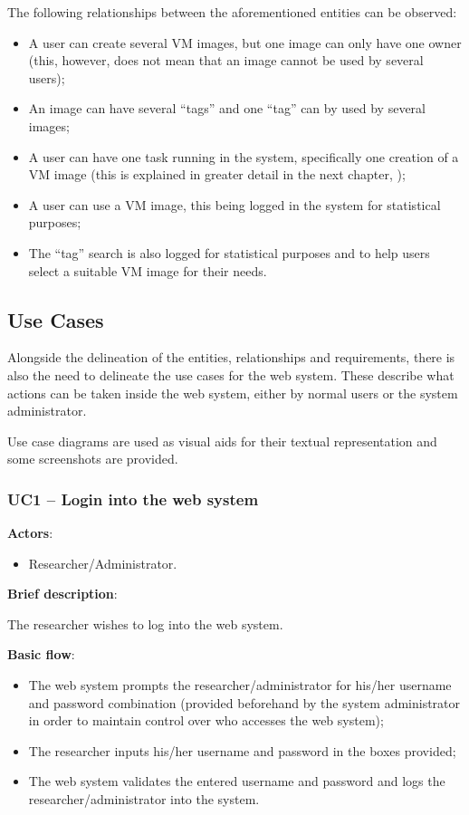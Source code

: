 The following relationships between the aforementioned entities can be observed:

\begin{itemize}
\item A user can create several VM images, but one image can only have one owner (this, however, does not mean that an image cannot be used by several users);
\item An image can have several ``tags'' and one ``tag'' can by used by several images;
\item A user can have one task running in the system, specifically one creation of a VM image (this is explained in greater detail in the next chapter, );
\item A user can use a VM image, this being logged in the system for statistical purposes;
\item The ``tag'' search is also logged for statistical purposes and to help users select a suitable VM image for their needs.
\end{itemize}

\subsection{Use Cases}\label{sec:use-cases}

Alongside the delineation of the entities, relationships and requirements, there is also the need to delineate the use cases for the web system. These describe what actions can be taken inside the web system, either by normal users or the system administrator.

Use case diagrams are used as visual aids for their textual representation and some screenshots are provided. 

\subsubsection{UC1 -- Login into the web system}\label{uc1}

\textbf{Actors}:

\begin{itemize}
\item Researcher/Administrator.
\end{itemize}

\textbf{Brief description}:

The researcher wishes to log into the web system.

\textbf{Basic flow}:

\begin{itemize}
\item The web system prompts the researcher/administrator for his/her username and password combination (provided beforehand by the system administrator in order to maintain control over who accesses the web system);
\item The researcher inputs his/her username and password in the boxes provided;
\item The web system validates the entered username and password and logs the researcher/administrator into the system.
\end{itemize}


